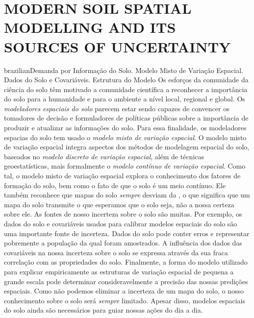 \artigotrue
\chapter{MODERN SOIL SPATIAL MODELLING AND ITS SOURCES OF UNCERTAINTY}
\label{chap:chap02}

\def\ptkeys{Demanda por Informação do Solo. Modelo Misto de Variação Espacial. Dados do Solo e Covariáveis. 
Estrutura do Modelo}
\begin{chapterabstract}{brazilian}{\ptkeys}
Os esforços da comunidade da ciência do solo têm motivado a comunidade científica a reconhecer a importância 
do solo para a humanidade e para o ambiente a nível local, regional e global. Os \emph{modeladores espaciais 
do solo} parecem estar sendo capazes de convencer os tomadores de decisão e formuladores de políticas públicas 
sobre a importância de produzir e atualizar as informações do solo. Para essa finalidade, os modeladores 
espacias do solo tem usado o \emph{modelo misto de variação espacial}. O modelo misto de variação espacial 
integra aspectos dos métodos  de modelagem espacial do solo, baseados no \emph{modelo discreto 
de variação espacial}, além de técnicas geoestatísticas, mais formalmente o \emph{modelo contínuo de 
variação espacial}. Como tal, o modelo misto de variação espacial explora o conhecimento dos fatores de 
formação do solo, bem como o fato de que o solo é um meio contínuo. Ele também reconhece que mapas do solo 
\emph{sempre} desviam da , o que significa que um mapa do solo transmite o que esperamos que 
o solo seja, não a nossa certeza sobre ele. As fontes de nosso incerteza sobre o solo são muitas. Por exemplo, 
os dados do solo e covariáveis usados para calibrar modelos espaciais do solo são uma importante fonte de 
incerteza. Dados do solo pode conter erros e representar pobremente a população da qual foram amostrados. A 
influência dos dados das covariáveis na nossa incerteza sobre o solo se expressa através da sua fraca 
correlação com as propriedades do solo. Finalmente, a forma do modelo utilizado para explicar empiricamente 
as estruturas de variação espacial de pequena a grande escala pode determinar consideravelmente a precisão das 
nossas predições espaciais. Como não podemos eliminar a incerteza de um mapa do solo, o nosso conhecimento 
sobre o solo será \emph{sempre} limitado. Apesar disso, modelos espaciais do solo ainda são necessários para 
guiar nossas ações do dia a dia.
\end{chapterabstract}

